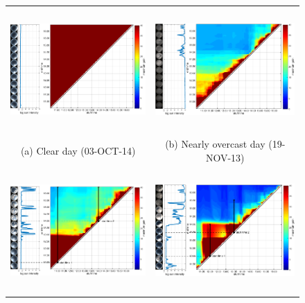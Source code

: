 \begin{figure}[!th]
\centering
\footnotesize
\setlength{\tabcolsep}{0pt}
\begin{tabular}{cc}
\includegraphics[height=4.7cm]{./figures/events/events-20141003-colorbar.pdf} & 
\includegraphics[height=4.7cm]{./figures/events/events-20131119-colorbar.pdf} \\
(a) Clear day (03-OCT-14) & (b) Nearly overcast day (19-NOV-13) \\%
\includegraphics[height=4.7cm]{./figures/events/events-20130824-colorbar.pdf} & 
\includegraphics[height=4.7cm]{./figures/events/events-20131106-colorbar.pdf} \\

\end{tabular}
\end{figure}

